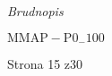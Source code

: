 \documentclass[a4paper,12pt]{article}
\begin{document}
{\it Brudnopis}

$\mathrm{M}\mathrm{M}\mathrm{A}\mathrm{P}-\mathrm{P}0_{-}100$

Strona 15 z30
\end{document}
